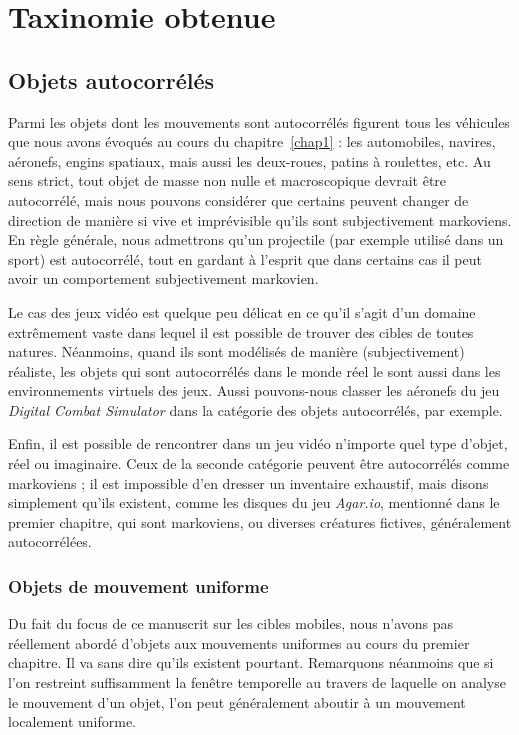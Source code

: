 \section{Taxinomie obtenue}
	\subsection{Objets autocorrélés}
	Parmi les objets dont les mouvements sont autocorrélés figurent tous les véhicules que nous avons évoqués au cours du chapitre~\ref{chap1} : les automobiles, navires, aéronefs, engins spatiaux, mais aussi les deux-roues, patins à roulettes, etc. Au sens strict, tout objet de masse non nulle et macroscopique devrait être autocorrélé, mais nous pouvons considérer que certains peuvent changer de direction de manière si vive et imprévisible qu'ils sont subjectivement markoviens. En règle générale, nous admettrons qu'un projectile (par exemple utilisé dans un sport) est autocorrélé, tout en gardant à l'esprit que dans certains cas il peut avoir un comportement subjectivement markovien.
	
	Le cas des jeux vidéo est quelque peu délicat en ce qu'il s'agit d'un domaine extrêmement vaste dans lequel il est possible de trouver des cibles de toutes natures. Néanmoins, quand ils sont modélisés de manière (subjectivement) réaliste, les objets qui sont autocorrélés dans le monde réel le sont aussi dans les environnements virtuels des jeux. Aussi pouvons-nous classer les aéronefs du jeu \emph{Digital Combat Simulator}\footnotemark{} dans la catégorie des objets autocorrélés, par exemple.
	
	
	Enfin, il est possible de rencontrer dans un jeu vidéo n'importe quel type d'objet, réel ou imaginaire. Ceux de la seconde catégorie peuvent être autocorrélés comme markoviens ; il est impossible d'en dresser un inventaire exhaustif, mais disons simplement qu'ils existent, comme les disques du jeu \emph{Agar.io}, mentionné dans le premier chapitre, qui sont markoviens, ou diverses créatures fictives, généralement autocorrélées.
	
	\subsubsection{Objets de mouvement uniforme}
	Du fait du focus de ce manuscrit sur les cibles mobiles, nous n'avons pas réellement abordé d'objets aux mouvements uniformes au cours du premier chapitre. Il va sans dire qu'ils existent pourtant. Remarquons néanmoins que si l'on restreint suffisamment la fenêtre temporelle au travers de laquelle on analyse le mouvement d'un objet, l'on peut généralement aboutir à un mouvement localement uniforme.
	
